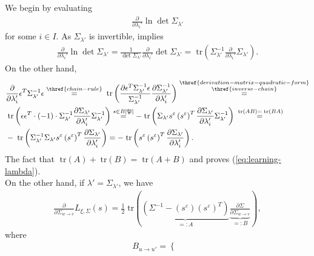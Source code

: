 \documentclass[a4paper,11pt]{report}
\newcommand{\tr}{\;\text{tr}}
\begin{document}
\begin{Bew}
We begin by evaluating
\begin{align*}
\frac{\partial}{\partial\lambda_i'}\ln\det\Sigma_{\lambda'}
\end{align*}
for some $i\in I$. As $\Sigma_{\lambda'}$ is invertible,  implies
\begin{align*}
\frac{\partial}{\partial\lambda_i'}\ln\det\Sigma_{\lambda'}=\frac{1}{\det\Sigma_{\lambda'}}\frac{\partial}{\partial\lambda_i'}\det\Sigma_{\lambda'}=\tr\left(\Sigma_{\lambda'}^{-1}\frac{\partial}{\partial\lambda_i'}\Sigma_{\lambda'}\right).
\end{align*}
On the other hand,
\begin{align*}
&\frac{\partial}{\partial\lambda_i'}\epsilon^T\Sigma_{\lambda'}^{-1}\epsilon\overset{\thref{chain-rule}}{=}
\tr\left(\frac{\partial\epsilon^T\Sigma_{\lambda'}^{-1}\epsilon}{\Sigma^{-1}_{\lambda'}}\frac{\partial\Sigma^{-1}_{\lambda'}}{\partial\lambda_i'}\right)
\overset{\substack{\thref{derivation-matrix-quadratic-form}\\\thref{inverse-chain}}}{=}\\
&\tr\left(\epsilon\epsilon^T\cdot(-1)\cdot\Sigma_{\lambda'}^{-1}\frac{\partial\Sigma_{\lambda'}}{\partial \lambda_i'}\Sigma_{\lambda'}^{-1}\right)\overset{s\in B[\mathfrak{P}]}{=}
-\tr\left(\Sigma_{\lambda'} s^{\varepsilon}\left(s^{\varepsilon}\right)^T\frac{\partial\Sigma_{\lambda'}}{\partial\lambda_i'}\Sigma_{\lambda'}^{-1}\right)\overset{\tr(AB)=\tr(BA)}{=}\\
&-\tr\left(\Sigma_{\lambda'}^{-1}\Sigma_{\lambda'}s^{\varepsilon}\left(s^{\varepsilon}\right)^T\frac{\partial\Sigma_{\lambda'}}{\partial\lambda_i'}\right)=
-\tr\left(s^{\varepsilon}\left(s^{\varepsilon}\right)^T\frac{\partial\Sigma_{\lambda'}}{\partial\lambda_i'}\right).
\end{align*}
The fact that $\tr(A)+\tr(B)=\tr(A+B)$ and  proves (\ref{eq:learning-lambda}).\\
On the other hand, if $\lambda'=\Sigma_{\lambda'}$, we have
\begin{align*}
\frac{\partial}{\partial\Sigma_{w\to v}}L_{\xi,\Sigma}(s)=
\frac12\tr\left(
\underbrace{\left(\Sigma^{-1}-\left(s^{\varepsilon}\right)\left(s^{\varepsilon}\right)^T\right)}_
{=:A}
\underbrace{\frac{\partial\Sigma}{\partial\Sigma_{w\to v}}}_{=:B}\right),
\end{align*}
where
\begin{align*}
B_{u\to u'}=\begin{cases}

\end{cases}
\end{align*}
\end{Bew}
\end{document}
